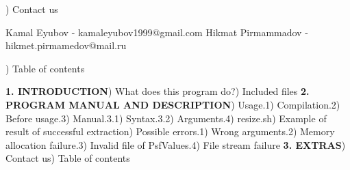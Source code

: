 \documentclass{article}
\begin{document}
) Contact us

Kamal Eyubov - kamaleyubov1999@gmail.com\newline
\indent Hikmat Pirmammadov - hikmet.pirmamedov@mail.ru

) Table of contents

\noindent\textbf{1. INTRODUCTION}) What does this program do?) Included files\newline
\textbf{2. PROGRAM MANUAL AND DESCRIPTION}) Usage.1) Compilation.2) Before usage.3) Manual.3.1) Syntax.3.2) Arguments.4) resize.sh) Example of result of successful extraction) Possible errors.1) Wrong arguments.2) Memory allocation failure.3) Invalid file of PsfValues.4) File stream failure\newline
\textbf{3. EXTRAS}) Contact us) Table of contents\newline
\end{document}
